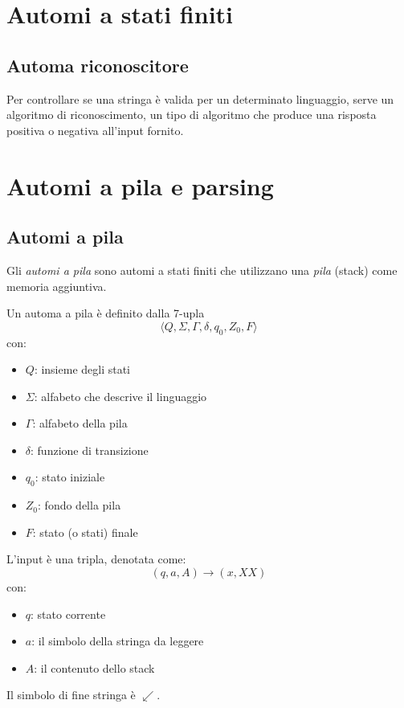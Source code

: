 \documentclass[11pt]{article}
\begin{document}
\section{Automi a stati finiti}
\subsection{Automa riconoscitore}
Per controllare se una stringa è valida per un determinato linguaggio, serve un algoritmo di riconoscimento, un tipo di 
algoritmo che produce una risposta positiva o negativa all'input fornito. 























\section{Automi a pila e parsing}
\subsection{Automi a pila}
Gli \textit{automi a pila} sono automi a stati finiti che utilizzano una \textit{pila} (stack) come memoria aggiuntiva.

Un automa a pila è definito dalla 7-upla 
\begin{equation*}
    \langle Q,\Sigma,\Gamma,\delta,q_0,Z_0,F \rangle
\end{equation*}
con:
\begin{itemize}
    \item $Q$: insieme degli stati
    \item $\Sigma$: alfabeto che descrive il linguaggio
    \item $\Gamma$: alfabeto della pila 
    \item $\delta$: funzione di transizione
    \item $q_0$: stato iniziale 
    \item $Z_0$: fondo della pila 
    \item $F$: stato (o stati) finale
\end{itemize}
L'input è una tripla, denotata come:
\begin{equation*}
    (q,a,A)\rightarrow(x,XX)
\end{equation*}
con:
\begin{itemize}
    \item $q$: stato corrente
    \item $a$: il simbolo della stringa da leggere
    \item $A$: il contenuto dello stack
\end{itemize}
Il simbolo di fine stringa è $\swarrow$.
\end{document}
